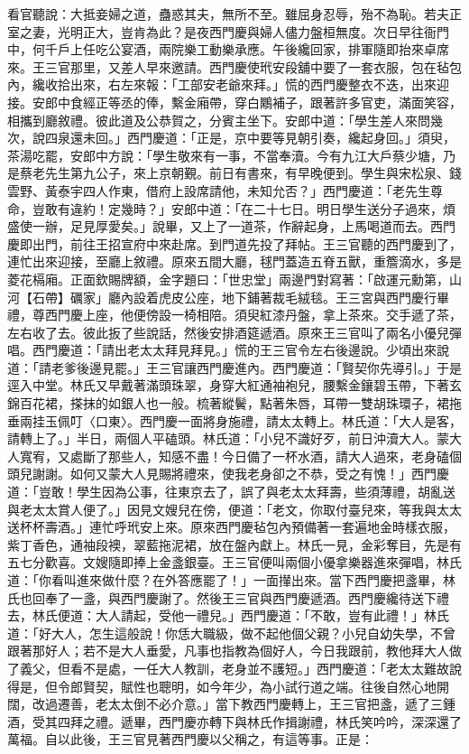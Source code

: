 \begin{showcontents}{}
看官聽說：大抵妾婦之道，蠱惑其夫，無所不至。雖屈身忍辱，殆不為恥。若夫正室之妻，光明正大，豈肯為此？是夜西門慶與婦人儘力盤桓無度。次日早往衙門中，何千戶上任吃公宴酒，兩院樂工動樂承應。午後纔回家，排軍隨即抬來卓席來。王三官那里，又差人早來邀請。西門慶使玳安段舖中要了一套衣服，包在毡包內，纔收拾出來，右左來報：「工部安老爺來拜。」慌的西門慶整衣不迭，出來迎接。安郎中食經正等丞的俸，繫金廂帶，穿白鷴補子，跟著許多官吏，滿面笑容，相攜到廳敘禮。彼此道及公恭賀之，分賓主坐下。安郎中道：「學生差人來問幾次，說四泉還未回。」西門慶道：「正是，京中要等見朝引奏，纔起身回。」須臾，茶湯吃罷，安郎中方說：「學生敬來有一事，不當奉瀆。今有九江大戶蔡少塘，乃是蔡老先生第九公子，來上京朝覲。前日有書來，有早晚便到。學生與宋松泉、錢雲野、黃泰宇四人作東，借府上設席請他，未知允否？」西門慶道：「老先生尊命，豈敢有違約！定幾時？」安郎中道：「在二十七日。明日學生送分子過來，煩盛使一辦，足見厚愛矣。」說畢，又上了一道茶，作辭起身，上馬喝道而去。西門慶即出門，前往王招宣府中來赴席。到門道先投了拜帖。王三官聽的西門慶到了，連忙出來迎接，至廳上敘禮。原來五間大廳，毬門蓋造五脊五獸，重簷滴水，多是菱花槅廂。正面欽賜牌額，金字題曰：「世忠堂」兩邊門對寫著：「啟運元勳第，山河【石帶】礪家」廳內設着虎皮公座，地下鋪著裁毛絨毯。王三宮與西門慶行畢禮，尊西門慶上座，他便傍設一椅相陪。須臾紅漆丹盤，拿上茶來。交手遞了茶，左右收了去。彼此扳了些說話，然後安排酒筵遞酒。原來王三官叫了兩名小優兒彈唱。西門慶道：「請出老太太拜見拜見。」慌的王三官令左右後邊說。少頃出來說道：「請老爹後邊見罷。」王三官讓西門慶進內。西門慶道：「賢契你先導引。」于是逕入中堂。林氏又早戴著滿頭珠翠，身穿大紅通袖袍兒，腰繫金鑲碧玉帶，下著玄錦百花裙，搽抹的如銀人也一般。梳著縱鬢，點著朱唇，耳帶一雙胡珠環子，裙拖垂兩挂玉佩叮〈口東〉。西門慶一面將身施禮，請太太轉上。林氏道：「大人是客，請轉上了。」半日，兩個人平磕頭。林氏道：「小兒不識好歹，前日沖瀆大人。蒙大人寬宥，又處斷了那些人，知感不盡！今日備了一杯水酒，請大人過來，老身磕個頭兒謝謝。如何又蒙大人見賜將禮來，使我老身卻之不恭，受之有愧！」西門慶道：「豈敢！學生因為公事，往東京去了，誤了與老太太拜壽，些須薄禮，胡亂送與老太太賞人便了。」因見文嫂兒在傍，便道：「老文，你取付臺兒來，等我與太太送杯杯壽酒。」連忙呼玳安上來。原來西門慶毡包內預備著一套遍地金時樣衣服，紫丁香色，通袖段襖，翠藍拖泥裙，放在盤內獻上。林氏一見，金彩奪目，先是有五七分歡喜。文嫂隨即捧上金盞銀臺。王三官便叫兩個小優拿樂器進來彈唱，林氏道：「你看叫進來做什麼？在外答應罷了！」一面攆出來。當下西門慶把盞畢，林氏也回奉了一盞，與西門慶謝了。然後王三官與西門慶遞酒。西門慶纔待送下禮去，林氏便道：大人請起，受他一禮兒。」西門慶道：「不敢，豈有此禮！」林氏道：「好大人，怎生這般說！你恁大職級，做不起他個父親？小兒自幼失學，不曾跟著那好人；若不是大人垂愛，凡事也指教為個好人，今日我跟前，教他拜大人做了義父，但看不是處，一任大人教訓，老身並不護短。」西門慶道：「老太太難故說得是，但令郎賢契，賦性也聰明，如今年少，為小試行道之端。往後自然心地開闊，改過遷善，老太太倒不必介意。」當下教西門慶轉上，王三官把盞，遞了三鍾酒，受其四拜之禮。遞畢，西門慶亦轉下與林氏作揖謝禮，林氏笑吟吟，深深還了萬福。自以此後，王三官見著西門慶以父稱之，有這等事。正是：


\end{showcontents}
